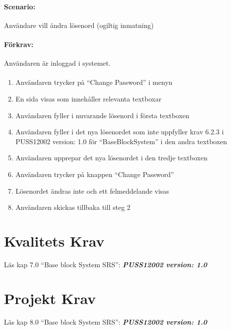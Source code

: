 \documentclass[paper=a4, fontsize=11pt,twoside]{article}
\begin{document}
	\paragraph{Scenario:}Användare vill ändra lösenord (ogiltig inmatning)
	\paragraph{Förkrav:}
	Användaren är inloggad i systemet.
	\paragraph{}
	\begin{enumerate}
		\item  Användaren trycker på “Change Password” i menyn
		\item	 En sida visas som innehåller relevanta textboxar
		\item	Användaren fyller i nuvarande lösenord i första textboxen
		\item	Användaren fyller i det nya lösenordet som inte uppfyller krav 6.2.3 i PUSS12002 version: 1.0 för “BaseBlockSystem” i den andra textboxen
		\item	Användaren upprepar det nya lösenordet i den tredje textboxen
		\item	Användaren trycker på knappen “Change Password”
		\item	Lösenordet ändras inte och ett felmeddelande visas
		\item Användaren skickas tillbaka till steg 2
		
	\end{enumerate}
	\newpage
	\section{Kvalitets Krav}
	Läs kap 7.0  “Base block System SRS”:   \textbf{\textit{PUSS12002 version: 1.0}} 
	\section{Projekt Krav}
	Läs kap 8.0  “Base block System SRS”:   \textbf{\textit{PUSS12002 version: 1.0}} 
\end{document}

